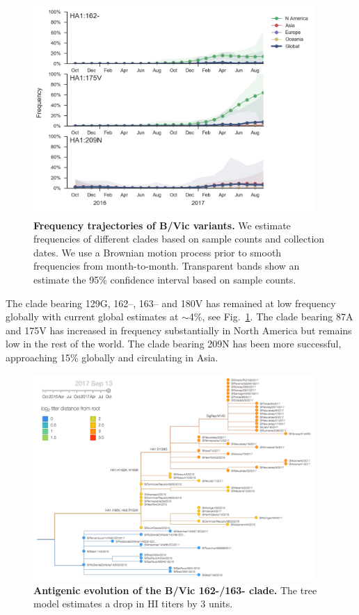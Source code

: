 \documentclass[11pt,oneside,letterpaper]{article}
\newcommand{\FIG}[1]{Fig.~\ref{#1}}
\begin{document}
\clearpage
\begin{figure}[H]
  \centering
  \includegraphics[width=0.95\textwidth]{../figures/sep-2017/vic_mutations.png}
  \caption{\textbf{Frequency trajectories of B/Vic variants.}
  We estimate frequencies of different clades based on sample counts and collection dates.
  We use a Brownian motion process prior to smooth frequencies from month-to-month.
  Transparent bands show an estimate the 95\% confidence interval based on sample counts.
  }
  \label{vic_mutations}
\end{figure}
The clade bearing 129G, 162--, 163-- and 180V has remained at low
frequency globally with current global estimates at
$\sim$4\%, see \FIG{vic_mutations}. The clade bearing 87A and 175V has increased in
frequency substantially in North America but remains low in the rest of
the world. The clade bearing 209N has been more successful, approaching
15\% globally and circulating in Asia.

\clearpage
\begin{figure}[H]
  \centering
  \includegraphics[width=0.95\textwidth]{../figures/sep-2017/vic_tree_titer_model.png}
  \caption{\textbf{Antigenic evolution of the B/Vic 162-/163- clade.}
  The tree model estimates a drop in HI titers by 3 units.
  }
  \label{vic_tree_titer_model}
\end{figure}
\end{document}
